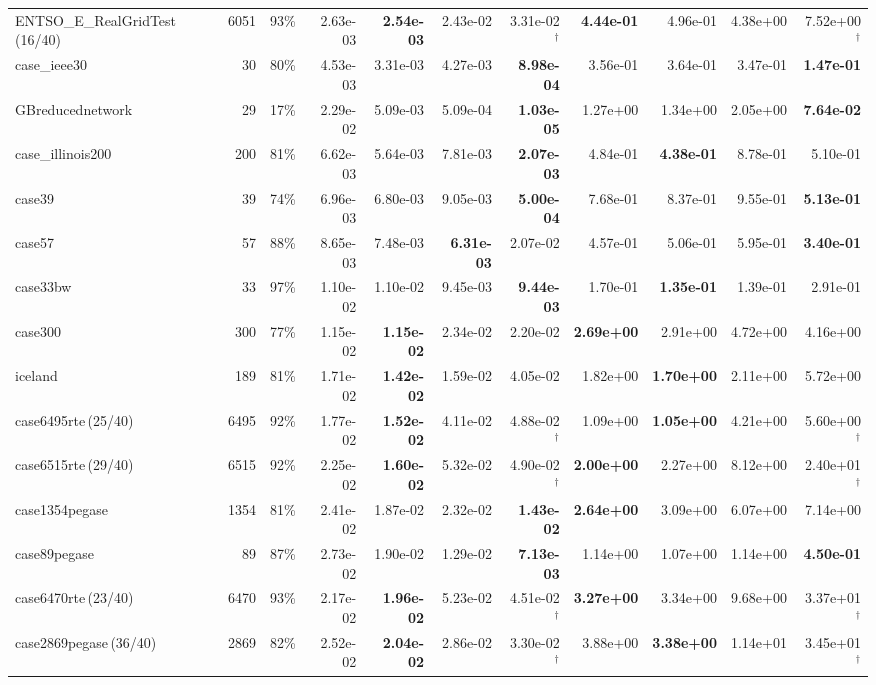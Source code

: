 \documentclass[10pt]{article}
\begin{document}
\begin{landscape}
\begin{table}[H]
\begin{tabular}{lrr rrrr rrrr}
ENTSO\_E\_RealGridTest\,(16/40) & 6051 & 93\% & 2.63e-03 & \textbf{2.54e-03} & 2.43e-02 & 3.31e-02$^\dagger$ & \textbf{4.44e-01} & 4.96e-01 & 4.38e+00 & 7.52e+00$^\dagger$ \\
case\_ieee30 & 30 & 80\% & 4.53e-03 & 3.31e-03 & 4.27e-03 & \textbf{8.98e-04} & 3.56e-01 & 3.64e-01 & 3.47e-01 & \textbf{1.47e-01} \\
GBreducednetwork & 29 & 17\% & 2.29e-02 & 5.09e-03 & 5.09e-04 & \textbf{1.03e-05} & 1.27e+00 & 1.34e+00 & 2.05e+00 & \textbf{7.64e-02} \\
case\_illinois200 & 200 & 81\% & 6.62e-03 & 5.64e-03 & 7.81e-03 & \textbf{2.07e-03} & 4.84e-01 & \textbf{4.38e-01} & 8.78e-01 & 5.10e-01 \\
case39 & 39 & 74\% & 6.96e-03 & 6.80e-03 & 9.05e-03 & \textbf{5.00e-04} & 7.68e-01 & 8.37e-01 & 9.55e-01 & \textbf{5.13e-01} \\
case57 & 57 & 88\% & 8.65e-03 & 7.48e-03 & \textbf{6.31e-03} & 2.07e-02 & 4.57e-01 & 5.06e-01 & 5.95e-01 & \textbf{3.40e-01} \\
case33bw & 33 & 97\% & 1.10e-02 & 1.10e-02 & 9.45e-03 & \textbf{9.44e-03} & 1.70e-01 & \textbf{1.35e-01} & 1.39e-01 & 2.91e-01 \\
case300 & 300 & 77\% & 1.15e-02 & \textbf{1.15e-02} & 2.34e-02 & 2.20e-02 & \textbf{2.69e+00} & 2.91e+00 & 4.72e+00 & 4.16e+00 \\
iceland & 189 & 81\% & 1.71e-02 & \textbf{1.42e-02} & 1.59e-02 & 4.05e-02 & 1.82e+00 & \textbf{1.70e+00} & 2.11e+00 & 5.72e+00 \\
case6495rte\,(25/40) & 6495 & 92\% & 1.77e-02 & \textbf{1.52e-02} & 4.11e-02 & 4.88e-02$^\dagger$ & 1.09e+00 & \textbf{1.05e+00} & 4.21e+00 & 5.60e+00$^\dagger$ \\
case6515rte\,(29/40) & 6515 & 92\% & 2.25e-02 & \textbf{1.60e-02} & 5.32e-02 & 4.90e-02$^\dagger$ & \textbf{2.00e+00} & 2.27e+00 & 8.12e+00 & 2.40e+01$^\dagger$ \\
case1354pegase & 1354 & 81\% & 2.41e-02 & 1.87e-02 & 2.32e-02 & \textbf{1.43e-02} & \textbf{2.64e+00} & 3.09e+00 & 6.07e+00 & 7.14e+00 \\
case89pegase & 89 & 87\% & 2.73e-02 & 1.90e-02 & 1.29e-02 & \textbf{7.13e-03} & 1.14e+00 & 1.07e+00 & 1.14e+00 & \textbf{4.50e-01} \\
case6470rte\,(23/40) & 6470 & 93\% & 2.17e-02 & \textbf{1.96e-02} & 5.23e-02 & 4.51e-02$^\dagger$ & \textbf{3.27e+00} & 3.34e+00 & 9.68e+00 & 3.37e+01$^\dagger$ \\
case2869pegase\,(36/40) & 2869 & 82\% & 2.52e-02 & \textbf{2.04e-02} & 2.86e-02 & 3.30e-02$^\dagger$ & 3.88e+00 & \textbf{3.38e+00} & 1.14e+01 & 3.45e+01$^\dagger$ \\

\end{tabular}
\end{table}
\end{landscape}
\end{document}
